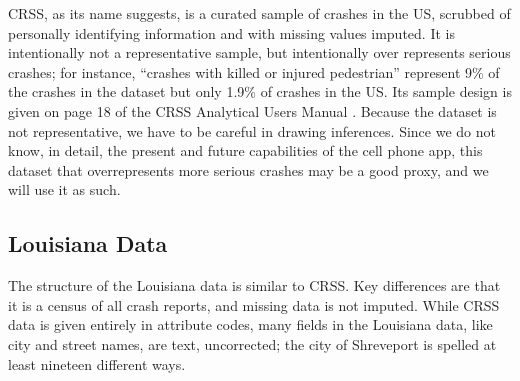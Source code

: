CRSS, as its name suggests, is a curated sample of crashes in the US, scrubbed of personally identifying information and with missing values imputed. It is intentionally not a representative sample, but intentionally over represents serious crashes; for instance, ``crashes with killed or injured pedestrian'' represent 9\% of the crashes in the dataset but only 1.9\% of crashes in the US.   Its sample design is given on page 18 of the CRSS Analytical Users Manual \citep{CRSS_Manual}.  Because the dataset is not representative, we have to be careful in drawing inferences.  Since we do not know, in detail, the present and future capabilities of the cell phone app, this dataset that overrepresents more serious crashes may be a good proxy, and we will use it as such.    


\subsection{Louisiana Data}

The structure of the Louisiana data is similar to CRSS.  Key differences are that it is a census of all crash reports, and missing data is not imputed.   While CRSS data is given entirely in attribute codes, many fields in the Louisiana data, like city and street names, are text, uncorrected; the city of Shreveport is spelled at least nineteen different ways.  

